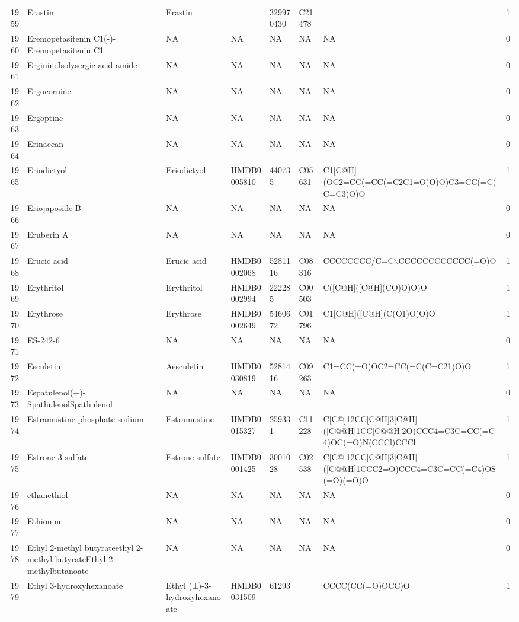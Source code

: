 \documentclass[a4paper]{article}
\begin{document}
\begin{longtable}{rlllllll}
  1959 & Erastin & Erastin &  & 329970430 & C21478 &  & 1 \\ 
  1960 & Eremopetasitenin C1(-)-Eremopetasitenin C1 & NA & NA & NA & NA & NA & 0 \\ 
  1961 & ErginineIsolysergic acid amide & NA & NA & NA & NA & NA & 0 \\ 
  1962 & Ergocornine & NA & NA & NA & NA & NA & 0 \\ 
  1963 & Ergoptine & NA & NA & NA & NA & NA & 0 \\ 
  1964 & Erinacean & NA & NA & NA & NA & NA & 0 \\ 
  1965 & Eriodictyol & Eriodictyol & HMDB0005810 & 440735 & C05631 & C1[C@H](OC2=CC(=CC(=C2C1=O)O)O)C3=CC(=C(C=C3)O)O & 1 \\ 
  1966 & Eriojaposide B & NA & NA & NA & NA & NA & 0 \\ 
  1967 & Eruberin A & NA & NA & NA & NA & NA & 0 \\ 
  1968 & Erucic acid & Erucic acid & HMDB0002068 & 5281116 & C08316 & CCCCCCCC/C=C$\backslash$CCCCCCCCCCCC(=O)O & 1 \\ 
  1969 & Erythritol & Erythritol & HMDB0002994 & 222285 & C00503 & C([C@H]([C@H](CO)O)O)O & 1 \\ 
  1970 & Erythrose & Erythrose & HMDB0002649 & 5460672 & C01796 & C1[C@H]([C@H](C(O1)O)O)O & 1 \\ 
  1971 & ES-242-6 & NA & NA & NA & NA & NA & 0 \\ 
  1972 & Esculetin & Aesculetin & HMDB0030819 & 5281416 & C09263 & C1=CC(=O)OC2=CC(=C(C=C21)O)O & 1 \\ 
  1973 & Espatulenol(+)-SpathulenolSpathulenol & NA & NA & NA & NA & NA & 0 \\ 
  1974 & Estramustine phosphate sodium & Estramustine & HMDB0015327 & 259331 & C11228 & C[C@]12CC[C@H]3[C@H]([C@@H]1CC[C@@H]2O)CCC4=C3C=CC(=C4)OC(=O)N(CCCl)CCCl & 1 \\ 
  1975 & Estrone 3-sulfate & Estrone sulfate & HMDB0001425 & 3001028 & C02538 & C[C@]12CC[C@H]3[C@H]([C@@H]1CCC2=O)CCC4=C3C=CC(=C4)OS(=O)(=O)O & 1 \\ 
  1976 & ethanethiol & NA & NA & NA & NA & NA & 0 \\ 
  1977 & Ethionine & NA & NA & NA & NA & NA & 0 \\ 
  1978 & Ethyl 2-methyl butyrateethyl 2-methyl butyrateEthyl 2-methylbutanoate & NA & NA & NA & NA & NA & 0 \\ 
  1979 & Ethyl 3-hydroxyhexanoate & Ethyl (±)-3-hydroxyhexanoate & HMDB0031509 & 61293 &  & CCCC(CC(=O)OCC)O & 1 \\ 

\end{longtable}
\end{document}
